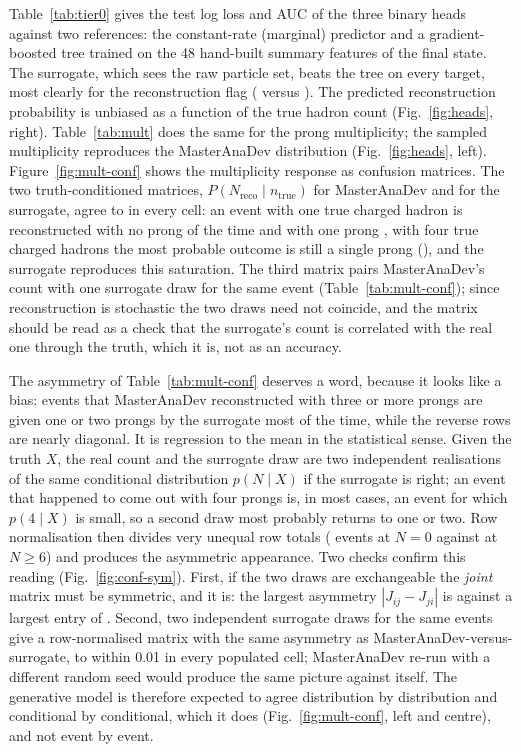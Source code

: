 \documentclass[11pt]{article}
\begin{document}
Table~\ref{tab:tier0} gives the test log loss and AUC of the three binary heads against two references: the
constant-rate (marginal) predictor and a gradient-boosted tree trained on the 48 hand-built summary features
of the final state. The surrogate, which sees the raw particle set, beats the tree on every target, most
clearly for the reconstruction flag (\nRecoLL{} versus \nRecoLLtree{}). The predicted
reconstruction probability is unbiased as a function of the true hadron count (Fig.~\ref{fig:heads}, right).
Table~\ref{tab:mult} does the same for the prong multiplicity; the sampled multiplicity reproduces the
MasterAnaDev distribution (Fig.~\ref{fig:heads}, left). Figure~\ref{fig:mult-conf} shows the multiplicity
response as confusion matrices. The two truth-conditioned matrices, $P(N_\mathrm{reco} \mid n_\mathrm{true})$
for MasterAnaDev and for the surrogate, agree to \nConfMaxDiff{} in every cell: an event with one true charged hadron is
reconstructed with no prong \nConfOneZero{} of the time and with one prong \nConfOneOne{}, with four true charged hadrons the most
probable outcome is still a single prong (\nConfFourOne{}), and the surrogate reproduces this saturation. The third matrix
pairs MasterAnaDev's count with one surrogate draw for the same event (Table~\ref{tab:mult-conf}); since
reconstruction is stochastic the two draws need not coincide, and the matrix should be read as a check that the
surrogate's count is correlated with the real one through the truth, which it is, not as an accuracy.

The asymmetry of Table~\ref{tab:mult-conf} deserves a word, because it looks like a bias: events that
MasterAnaDev reconstructed with three or more prongs are given one or two prongs by the surrogate most of the
time, while the reverse rows are nearly diagonal. It is regression to the mean in the statistical sense. Given
the truth $X$, the real count and the surrogate draw are two independent realisations of the same conditional
distribution $p(N \mid X)$ if the surrogate is right; an event that happened to come out with four prongs is,
in most cases, an event for which $p(4 \mid X)$ is small, so a second draw most probably returns to one or
two. Row normalisation then divides very unequal row totals (\nEvZero{} events at $N=0$ against \nEvSixPlus{} at $N \ge 6$)
and produces the asymmetric appearance. Two checks confirm this reading (Fig.~\ref{fig:conf-sym}). First, if the
two draws are exchangeable the \emph{joint} matrix must be symmetric, and it is: the largest asymmetry
$|J_{ij} - J_{ji}|$ is \nJointAsym{} against a largest entry of \nJointMax{}. Second, two independent surrogate draws
for the same events give a row-normalised matrix with the same asymmetry as MasterAnaDev-versus-surrogate,
to within 0.01 in every populated cell; MasterAnaDev re-run with a different random seed would produce the same
picture against itself. The generative model is therefore expected to agree distribution by distribution and
conditional by conditional, which it does (Fig.~\ref{fig:mult-conf}, left and centre), and not event by event.
\end{document}

